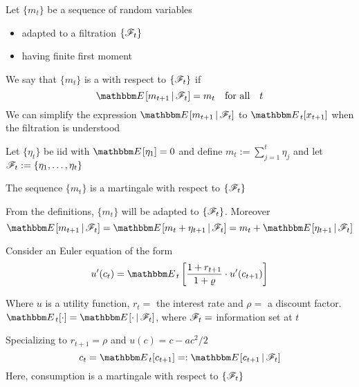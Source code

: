 \begin{frame}
    
    \vspace{2em}
    Let $\{m_t\}$ be a sequence of random variables 
    \begin{itemize}
        \item adapted to a filtration $\{\mathscr F_t\}$
        \item having finite first moment
    \end{itemize}
    
    \vspace{1em}
    We say that $\{m_t\}$ is a  with respect to $\{\mathscr F_t\}$ if 
    \begin{equation*}
        \EE [ m_{t+1} \given \fF_t] = m_t 
        \quad \text{for all} \quad t
    \end{equation*}
    We can simplify the expression $\EE [ m_{t+1} \given \fF_t]$ to $\EE_{t}[x_{t+1}]$
    when the filtration is understood
    
\end{frame}


\begin{frame}

    \vspace{2em}
    \Eg Let $\{\eta_t\}$ be {\sc iid} with $\EE[\eta_1] = 0$ and define $m_t := \sum_{j=1}^t \eta_j$
    and let $\mathscr F_t := \{\eta_1, \ldots, \eta_t\}$
    
    The sequence $\{m_t\}$ is a martingale with respect to $\{\mathscr F_t\}$
    
    From the definitions, $\{m_t\}$ will be adapted to $\{\mathscr F_t\}$. Moreover
    \begin{equation*}
        \EE[ m_{t+1} \given \fF_t]  
         =  \EE[  m_t + \eta_{t+1} \given \fF_t] 
         =  m_t + \EE[ \eta_{t+1} \given \fF_t]
    \end{equation*}
    
\end{frame}


\begin{frame}
    
    \vspace{2em}
    \Eg Consider an Euler equation of the form
    \begin{equation*}
        u'(c_t) = \EE_t \left[ \frac{1+r_{t+1}}{1+\rho} \cdot u'(c_{t+1}) \right]
    \end{equation*}
    
    \vspace{1em}
    Where $u$ is a utility function, $r_t =$ the interest rate and $\rho =$ a discount factor.
    $\EE_t[\cdot] = \EE[\cdot \given \fF_t]$, where $\mathscr F_t =$ information set at $t$  
    
    Specializing to $r_{t+1} = \rho$ and $u(c) = c - a c^2 / 2$
    \begin{equation*}
        c_t 
        = \EE_t [c_{t+1} ]
        =: \EE [c_{t+1} \given \fF_t ]
    \end{equation*}
    Here, consumption is a martingale with respect to $\{\mathscr F_t\}$
    
\end{frame}

